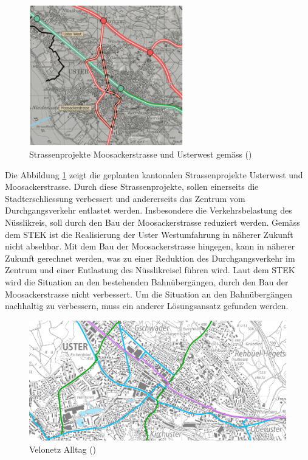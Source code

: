 \begin{figure}[h!]
	\centering
	\includegraphics[width=0.6\textwidth]{figures/f-04-04-UsterWest-Moosackerstr}
	\caption[Strassenprojekte Uster]{Strassenprojekte Moosackerstrasse und Usterwest gemäss (\cite{STEK})}
	\label{img:Strassenprojekte}
\end{figure}

Die Abbildung \ref{img:Strassenprojekte} zeigt die geplanten kantonalen Strassenprojekte Usterwest und Moosackerstrasse. Durch diese Strassenprojekte, sollen einerseits die Stadterschliessung verbessert und andererseits das Zentrum vom Durchgangsverkehr entlastet werden. Insbesondere die Verkehrsbelastung des Nüsslikreis, soll durch den Bau der Moosackerstrasse reduziert werden. Gemäss dem STEK ist die Realisierung der Uster Westumfahrung in näherer Zukunft nicht absehbar. Mit dem Bau der Moosackerstrasse hingegen, kann in näherer Zukunft gerechnet werden, was zu einer Reduktion des Durchgangsverkehr im Zentrum und einer Entlastung des Nüsslikreisel führen wird. Laut dem STEK wird die Situation an den bestehenden Bahnübergängen, durch den Bau der Moosackerstrasse nicht verbessert. Um die Situation an den Bahnübergängen nachhaltig zu verbessern, muss ein anderer Lösungsansatz gefunden werden. 

\begin{figure}[h!]
	\centering
	\includegraphics[width=\textwidth]{figures/f-04-01-Veloweg-Alltag}
	\caption[Velonetz Alltag]{Velonetz Alltag (\cite{GIS})}
	\label{img:Velonetz}
\end{figure}
 
